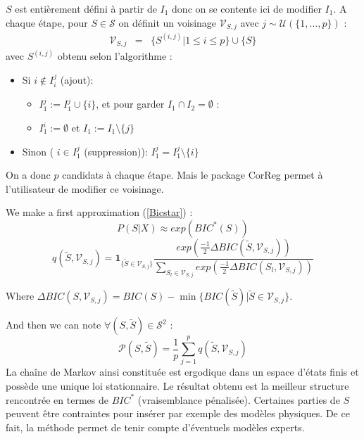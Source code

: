 \documentclass[12pt]{article}
\begin{document}
	$S$ est entièrement défini à partir de $I_1$ donc on se contente ici de modifier $I_1$. %
	A chaque étape, pour $S \in \mathcal{S}$ on définit un voisinage $\mathcal{V}_{S,j}$ avec $j \sim \mathcal{U}(\{1,\dots,p\}) $ :%
	\begin{eqnarray}
		\mathcal{V}_{S,j}&=&\{ S^{(i,j)} | 1\leq i\leq p \} \cup\{S \}
	\end{eqnarray}	
	avec $S^{(i,j)}$ obtenu selon l'algorithme :
	\begin{itemize}
		\item Si $i \notin I_i^j$ (ajout): 
			\begin{itemize}
				\item $I_1^j :=I_1^j\cup \{i\}$, et pour garder $I_1\cap I_2=\emptyset$ :
				\item $I_1^i :=\emptyset$ et $I_1:=I_1 \setminus \{j\}$
			\end{itemize}			 
		\item Sinon ( $i \in I_1^j$ (suppression)): $I_1^j=I_1^j\setminus \{i\}$
	\end{itemize}
	
	On a donc $p$ candidats à chaque étape. Mais le package CorReg permet à l'utilisateur de modifier ce voisinage.
	
		
	We make a first approximation (\ref{Bicstar}) : 
	\begin{equation}
		P(S|X)\approx exp(BIC^*(S))
	\end{equation}
	\begin{equation}
		q(\tilde{S},\mathcal{V}_{S,j})=\mathbf{1}_{ \{\tilde{S}\in \mathcal{V}_{S,j}\} }\frac{exp(\frac{-1}{2}\Delta BIC(\tilde{S},\mathcal{V}_{S,j}))}{\sum_{S_l\in \mathcal{V}_{S,j}}exp(\frac{-1}{2}\Delta BIC(S_l,\mathcal{V}_{S,j}))}
	\end{equation}
	
	Where $\Delta BIC(S,\mathcal{V}_{S,j})=BIC(S)-\min\{BIC(\tilde{S})| \tilde{S} \in \mathcal{V}_{S,j} \} $.
	\newline
	
	 And then we can note $\forall (S,\tilde{S}) \in \mathcal{S}^2 $ :
		\begin{displaymath}
			\mathcal{P}(S,\tilde{S})= \frac{1}{p} \sum_{j=1}^p q(\tilde{S},\mathcal{V}_{S,j})
		\end{displaymath}
		La chaîne de Markov ainsi constituée est ergodique dans un espace d'états finis et possède une unique loi stationnaire.
		Le résultat obtenu est la meilleur structure rencontrée en termes de $BIC^*$ (vraisemblance pénalisée). Certaines parties de $S$ peuvent être contraintes pour insérer par exemple des modèles physiques. De ce fait, la méthode permet de tenir compte d'éventuels modèles experts.
\end{document}
